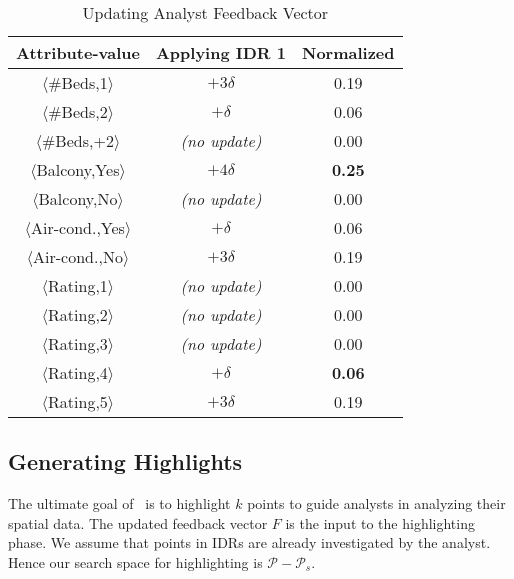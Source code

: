 \begin{table}[t]
\centering
\caption{Updating Analyst Feedback Vector}
\label{tbl:feedback}
\begin{tabular}{|c|c|c|}
\hline
\textbf{Attribute-value}               & \textbf{Applying IDR 1} & \textbf{Normalized} \\ \hline
$\langle$\#Beds,1$\rangle$                   & $+3\delta$                       & 0.19                 \\ \hline
$\langle$\#Beds,2$\rangle$                 & $+\delta$                       & 0.06                 \\ \hline
$\langle$\#Beds,+2$\rangle$                  & {\em (no update)}                       & 0.00                    \\ \hline
$\langle$Balcony,Yes$\rangle$                   & $+4\delta$                      & {\bf 0.25}                 \\ \hline
$\langle$Balcony,No$\rangle$                    & {\em (no update)}                        & 0.00                    \\ \hline
$\langle$Air-cond.,Yes$\rangle$               & $+\delta$                       & 0.06                 \\ \hline
$\langle$Air-cond.,No$\rangle$                & $+3\delta$                       & 0.19                 \\ \hline
$\langle$Rating,1$\rangle$                    & {\em (no update)}                       & 0.00                    \\ \hline
$\langle$Rating,2$\rangle$                     & {\em (no update)}                        & 0.00                    \\ \hline
$\langle$Rating,3$\rangle$                    & {\em (no update)}                        & 0.00                   \\ \hline
$\langle$Rating,4$\rangle$                   & $+\delta$                       & {\bf 0.06}                 \\ \hline
$\langle$Rating,5$\rangle$                     & $+3\delta$                      & 0.19                 \\ \hline
\end{tabular}
\end{table}

\subsection{Generating Highlights}
The ultimate goal of \sgg\ is to highlight $k$ points to guide analysts in analyzing their spatial data. The updated feedback vector $F$ is the input to the highlighting phase. We assume that points in IDRs are already investigated by the analyst. Hence our search space for highlighting is $\mathcal{P} - \mathcal{P}_s$.

